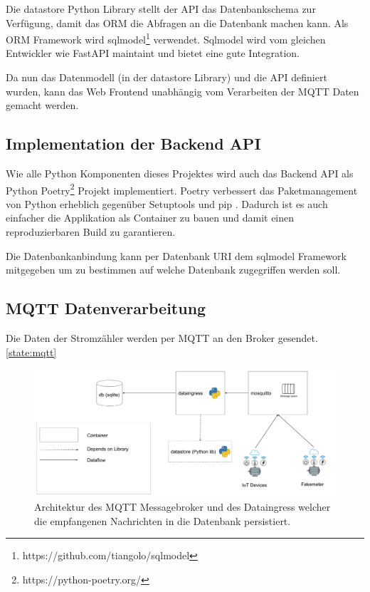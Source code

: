 Die datastore Python Library stellt der \ac{API} das Datenbankschema zur Verfügung,
damit das \ac{ORM} die Abfragen an die Datenbank machen kann.
Als \ac{ORM} Framework wird sqlmodel\footnote{https://github.com/tiangolo/sqlmodel} verwendet.
Sqlmodel wird vom gleichen Entwickler wie FastAPI maintaint und bietet eine gute Integration.

Da nun das Datenmodell (in der datastore Library) und die \ac{API} definiert wurden,
kann das Web Frontend unabhängig vom Verarbeiten der \ac{MQTT} Daten gemacht werden.

\subsection{Implementation der Backend \ac{API}}

Wie alle Python Komponenten dieses Projektes wird auch das Backend \ac{API}
als Python Poetry\footnote{https://python-poetry.org/} Projekt implementiert.
Poetry verbessert das Paketmanagement von Python erheblich gegenüber Setuptools
und pip \parencite{python_poetry}.
Dadurch ist es auch einfacher die Applikation als Container zu bauen und
damit einen reproduzierbaren Build zu garantieren.

Die Datenbankanbindung kann per Datenbank \ac{URI} dem sqlmodel Framework
mitgegeben um zu bestimmen auf welche Datenbank zugegriffen werden soll.



\subsection{\ac{MQTT} Datenverarbeitung}

Die Daten der Stromzähler werden per \ac{MQTT} an den Broker gesendet. \ref{state:mqtt}

\begin{figure}[h]
    \centering
    \includegraphics[width=1.0\textwidth]{gfx/smic-arch-mqtt}
    \caption{
        Architektur des \ac{MQTT} Messagebroker und des Dataingress welcher die
        empfangenen Nachrichten in die Datenbank persistiert.
    }
    \label{fig:arch-mqtt}
\end{figure}

